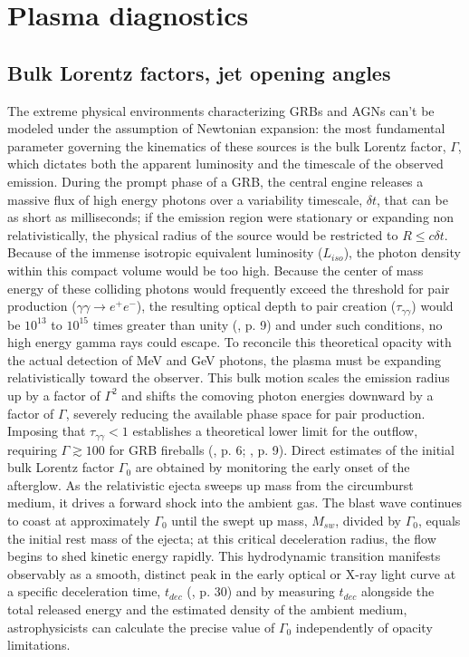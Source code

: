 \documentclass{aa} %
\begin{document}
\section{Plasma diagnostics}

\subsection{Bulk Lorentz factors, jet opening angles}
The extreme physical environments characterizing GRBs and AGNs can't be modeled under the assumption of Newtonian expansion: the most fundamental parameter governing the kinematics of these sources is the bulk Lorentz factor, $\Gamma$, which dictates both the apparent luminosity and the timescale of the observed emission. 
During the prompt phase of a GRB, the central engine releases a massive flux of high energy photons over a variability timescale, $\delta t$, that can be as short as milliseconds; if the emission region were stationary or expanding non relativistically, the physical radius of the source would be restricted to $R \le c \delta t$. Because of the immense isotropic equivalent luminosity ($L_{iso}$), the photon density within this compact volume would be too high. Because the center of mass energy of these colliding photons would frequently exceed the threshold for pair production ($\gamma\gamma \rightarrow e^+ e^-$), the resulting optical depth to pair creation ($\tau_{\gamma\gamma}$) would be $10^{13}$ to $10^{15}$ times greater than unity (\citet{Peer2019}, p. 9) and under such conditions, no high energy gamma rays could escape. To reconcile this theoretical opacity with the actual detection of MeV and GeV photons, the plasma must be expanding relativistically toward the observer. This bulk motion scales the emission radius up by a factor of $\Gamma^2$ and shifts the comoving photon energies downward by a factor of $\Gamma$, severely reducing the available phase space for pair production. Imposing that $\tau_{\gamma\gamma} < 1$ establishes a theoretical lower limit for the outflow, requiring $\Gamma \gtrsim 100$ for GRB fireballs (\citet{KumarandZhang2015}, p. 6; \citet{Peer2019}, p. 9).
Direct estimates of the initial bulk Lorentz factor $\Gamma_0$ are obtained by monitoring the early onset of the afterglow. As the relativistic ejecta sweeps up mass from the circumburst medium, it drives a forward shock into the ambient gas. The blast wave continues to coast at approximately $\Gamma_0$ until the swept up mass, $M_{sw}$, divided by $\Gamma_0$, equals the initial rest mass of the ejecta; at this critical deceleration radius, the flow begins to shed kinetic energy rapidly. This hydrodynamic transition manifests observably as a smooth, distinct peak in the early optical or X-ray light curve at a specific deceleration time, $t_{dec}$ (\citet{KumarandZhang2015}, p. 30) and by measuring $t_{dec}$ alongside the total released energy and the estimated density of the ambient medium, astrophysicists can calculate the precise value of $\Gamma_0$ independently of opacity limitations.
\end{document}

